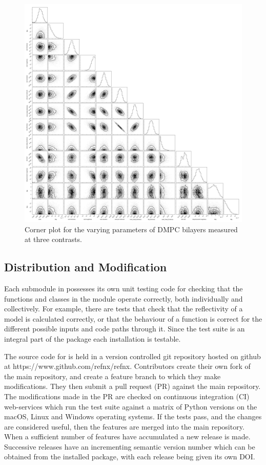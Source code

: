 \documentclass[12pt]{article}
\begin{document}
\begin{figure}
  \includegraphics[width=\linewidth]{./datasets/corner}
  \caption{Corner plot for the varying parameters of DMPC bilayers measured at three contrasts.}
  \label{fig:corner}
\end{figure}

 
\subsection*{Distribution and Modification}
Each submodule in  possesses its own unit testing code for checking that the functions and classes in the module operate correctly, both individually and collectively. For example, there are tests that check that the reflectivity of a model is calculated correctly, or that the behaviour of a function is correct for the different possible inputs and code paths through it. Since the test suite is an integral part of the package each installation is testable.
 
 The source code for  is held in a version controlled git repository hosted on github at https://www.github.com/refnx/refnx. Contributors create their own fork of the main  repository, and create a feature branch to which they make modifications. They then submit a pull request (PR) against the main repository. The modifications made in the PR are checked on continuous integration (CI) web-services which run the test suite against a matrix of Python versions on the macOS, Linux and Windows operating systems. If the tests pass, and the changes are considered useful, then the features are merged into the main repository. When a sufficient number of features have accumulated a new release is made. Successive releases have an incrementing semantic version number which can be obtained from the installed package, with each release being given its own DOI.
\end{document}
